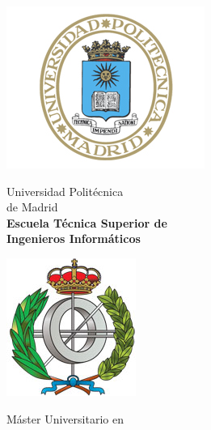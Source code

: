 \begin{titlepage}

\begin{minipage}{0.15\linewidth}
\hspace*{-2.5cm}
\noindent
\includegraphics[scale=0.5]{./imagenes/EscUpm.png} \qquad\qquad
\end{minipage}
\begin{minipage}{0.7\linewidth}
\begin{center}
\huge{ Universidad Politécnica\\de Madrid }\\
\vspace*{0.5cm}
\Large{\textbf{Escuela Técnica Superior de \\
Ingenieros Informáticos}}
\end{center}
\end{minipage}
\begin{minipage}{0.2\linewidth}
\includegraphics[scale=0.5]{./imagenes/FacInformatica.png} 
\end{minipage}

\vspace*{1cm}
\begin{center}
\Large{Máster Universitario en  \Master{} }
\end{center}


\end{titlepage}
